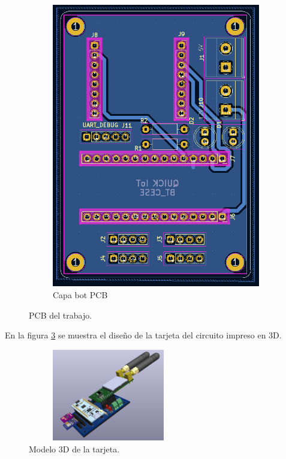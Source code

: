 \begin{figure}[h!]
\begin{subfigure}[b]{0.27\linewidth}
  \includegraphics[width=\linewidth]{./Figures/pcb_bot.png}
  \caption{Capa bot PCB}
  \label{fig:Capa bot PCB}
  \end{subfigure}
  \caption{PCB del trabajo.}
  \label{fig:PCB del proyecto}
\end{figure}
\clearpage
En la figura \ref{fig:3D del modulo} se muestra el diseño de la tarjeta del circuito impreso en 3D.
\begin{figure}[h!]
  \centering
	\includegraphics[width=7cm, height=4cm]{./Figures/tarjeta3d.png}
  \caption{Modelo 3D de la tarjeta.}
	\label{fig:3D del modulo}
\end{figure}
